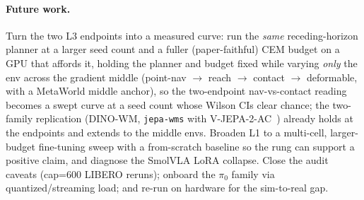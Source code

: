 \documentclass[10pt]{article}
\begin{document}
\paragraph{Future work.}
Turn the two L3 endpoints into a measured curve: run the \emph{same}
receding-horizon planner at a larger seed count and a fuller
(paper-faithful) CEM budget on a GPU that affords it, holding the planner
and budget fixed while varying \emph{only} the env across the gradient
middle (point-nav $\to$ reach $\to$ contact $\to$ deformable, with a
MetaWorld middle anchor), so the two-endpoint nav-vs-contact reading becomes
a swept curve at a seed count whose Wilson CIs clear chance; the two-family
replication (DINO-WM, \texttt{jepa-wms} with
V-JEPA-2-AC~\cite{assran2025vjepa2}) already holds at the endpoints and
extends to the middle envs. Broaden L1 to a
multi-cell, larger-budget fine-tuning sweep with a from-scratch baseline
so the rung can support a positive claim, and diagnose the SmolVLA LoRA
collapse. Close the audit caveats (cap=600 LIBERO reruns); onboard the
$\pi_0$ family via quantized/streaming load; and re-run on hardware for
the sim-to-real gap.


{\footnotesize
\setlength{\itemsep}{0pt}


}
\end{document}
